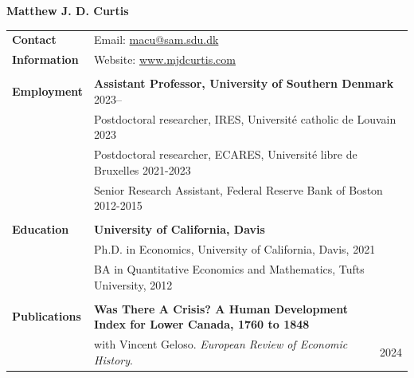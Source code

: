 \documentclass[a4paper,11pt,oneside]{article}
\begin{document}

\noindent  \LARGE{\textbf{Matthew J. D. Curtis}}  \\

\normalsize




\noindent \begin{longtable}{@{} p{0.175\linewidth} p{0.775\linewidth} p{0.05\linewidth}}
   
   
   
   \textbf{\large{Contact}}    &  \multicolumn{2}{l}{Email: \href{mailto:macu@sam.sdu.dk}{macu@sam.sdu.dk} }\\
   \textbf{\large{Information}}  &  \multicolumn{2}{l}{Website: \href{https://www.mjdcurtis.com/}{www.mjdcurtis.com} }\\
   \\ 
   
   \textbf{\large{Employment}}   
   &  \multicolumn{2}{l}{  \textbf{Assistant Professor, University of Southern Denmark} \hfill  2023--}\\
   &  \multicolumn{2}{l}{ Postdoctoral researcher, IRES, Universit\'{e} catholic de Louvain \hfill  2023}\\
   &  \multicolumn{2}{l}{ Postdoctoral researcher, ECARES, Universit\'{e} libre de Bruxelles \hfill  2021-2023}\\
   &  \multicolumn{2}{l}{ Senior Research Assistant, Federal Reserve Bank of Boston \hfill  2012-2015}\\
   \\
   \textbf{\large{Education}}    & \multicolumn{2}{l}{\textbf{University of California, Davis}} \\
   &  \multicolumn{2}{l}{Ph.D. in Economics, University of California, Davis, 2021}\\
   &  \multicolumn{2}{l}{BA in Quantitative Economics and Mathematics, Tufts University, 2012}\\
   \\
   
   \textbf{\large{Publications}}       
   &  \textbf{Was There A Crisis? A Human Development Index for Lower Canada, 1760 to 1848 } \\ 
   &   with Vincent Geloso.  \emph{European Review of Economic History}.  &  2024 \\



\end{longtable}
\end{document}
